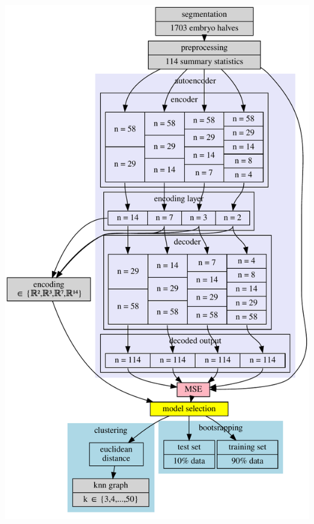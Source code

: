 \documentclass{beamer}
\begin{document}
{\begin{columns}
\begin{column}{0.50\textwidth}
			\includegraphics[width=\textwidth]{flowchart/autoencoder.dot.pdf}
		\end{column}
	\end{columns}
}

\end{document}
